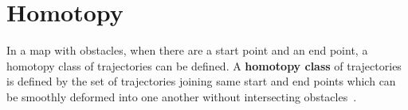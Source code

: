 \section{Homotopy}

In a map with obstacles, when there are a start point and an end point, a homotopy class of trajectories can be defined.
A \textbf{homotopy class} of trajectories is defined by the set of trajectories joining same start and end points which can be smoothly deformed into one another without intersecting obstacles~\cite{bhattacharya2010search}.